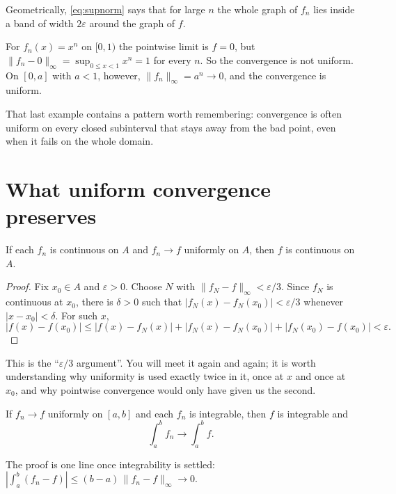 Geometrically, \eqref{eq:supnorm} says that for large $n$ the whole graph of $f_n$ lies inside a band of width $2\varepsilon$ around the graph of $f$.

\begin{example}
For $f_n(x) = x^n$ on $[0,1)$ the pointwise limit is $f = 0$, but $\|f_n - 0\|_\infty = \sup_{0 \le x < 1} x^n = 1$ for every $n$. So the convergence is not uniform. On $[0, a]$ with $a < 1$, however, $\|f_n\|_\infty = a^n \to 0$, and the convergence is uniform.
\end{example}

That last example contains a pattern worth remembering: convergence is often uniform on every closed subinterval that stays away from the bad point, even when it fails on the whole domain.

\section{What uniform convergence preserves}

\begin{theorem}\label{thm:continuity}
If each $f_n$ is continuous on $A$ and $f_n \to f$ uniformly on $A$, then $f$ is continuous on $A$.
\end{theorem}

\begin{proof}
Fix $x_0 \in A$ and $\varepsilon > 0$. Choose $N$ with $\|f_N - f\|_\infty < \varepsilon/3$. Since $f_N$ is continuous at $x_0$, there is $\delta > 0$ such that $|f_N(x) - f_N(x_0)| < \varepsilon/3$ whenever $|x - x_0| < \delta$. For such $x$,
\[
  |f(x) - f(x_0)| \le |f(x) - f_N(x)| + |f_N(x) - f_N(x_0)| + |f_N(x_0) - f(x_0)| < \varepsilon.
\]
\end{proof}

This is the ``$\varepsilon/3$ argument''. You will meet it again and again; it is worth understanding why uniformity is used exactly twice in it, once at $x$ and once at $x_0$, and why pointwise convergence would only have given us the second.

\begin{theorem}[Integrals]\label{thm:integrals}
If $f_n \to f$ uniformly on $[a,b]$ and each $f_n$ is integrable, then $f$ is integrable and
\[
  \int_a^b f_n \to \int_a^b f.
\]
\end{theorem}

The proof is one line once integrability is settled: $\left|\int_a^b (f_n - f)\right| \le (b-a)\,\|f_n - f\|_\infty \to 0$.


